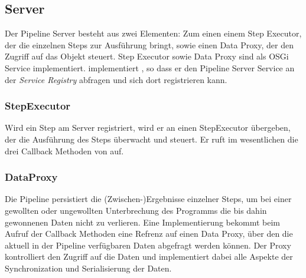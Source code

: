 \subsection{Server}
Der Pipeline Server besteht aus zwei Elementen: Zum einen einem 
Step Executor, der die einzelnen Steps zur Ausführung bringt, sowie einen
Data Proxy, der den Zugriff auf das  Objekt steuert.
Step Executor sowie Data Proxy sind als OSGi Service implementiert.
 implementiert , so dass er den
Pipeline Server Service an der \textit{Service Registry} abfragen und sich dort
registrieren kann.
%

\subsubsection{StepExecutor}
Wird ein Step am Server registriert, wird er an einen StepExecutor übergeben,
der die Ausführung des Steps überwacht und steuert. Er ruft im wesentlichen
die drei Callback Methoden von  auf.


\subsubsection{DataProxy}
Die Pipeline persistiert die (Zwischen-)Ergebnisse einzelner Steps, um bei
einer gewollten oder ungewollten Unterbrechung des Programms die bis dahin
gewonnenen Daten nicht zu verlieren. Eine  Implementierung bekommt
beim Aufruf der Callback Methoden eine Refrenz auf einen Data Proxy, über den
die aktuell in der Pipeline verfügbaren Daten abgefragt werden können. Der
Proxy kontrolliert den Zugriff auf die Daten und implementiert dabei alle
Aspekte der Synchronization und Serialisierung der Daten.

